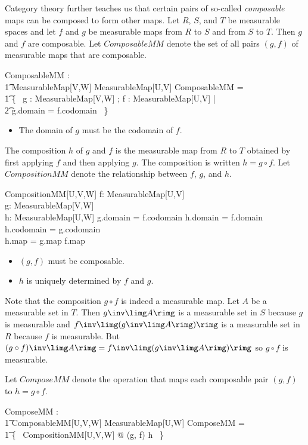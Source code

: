 \documentclass{article}
\begin{document}
Category theory further teaches us that certain pairs of so-called {\it composable} maps can be composed to form other maps.
Let $R$, $S$, and $T$ be measurable spaces and let $f$ and $g$ be measurable maps from $R$ to $S$ and from $S$ to $T$.
Then $g$ and $f$ are composable.
Let $ComposableMM$ denote the set of all pairs $(g,f)$ of measurable maps that are composable.
\begin{gendef}[U,V,W]
	ComposableMM : \\
\t1		MeasurableMap[V,W] \rel MeasurableMap[U,V]
\where
	ComposableMM = \\
\t1		\{~  g : MeasurableMap[V,W] ; f : MeasurableMap[U,V] | \\
\t2			g.domain = f.codomain ~\}
\end{gendef}
\begin{itemize}
\item  The domain of $g$ must be the codomain of $f$.
\end{itemize}

The composition $h$ of $g$ and $f$ is the measurable map from $R$ to $T$ obtained by first applying $f$ and then applying $g$.
The composition is written $h = g \circ f$. 
Let $CompositionMM$ denote the relationship between $f$, $g$, and $h$.
\begin{schema}{CompositionMM}[U,V,W]
	f: MeasurableMap[U,V] \\
	g: MeasurableMap[V,W] \\
	h: MeasurableMap[U,W]
\where
	g.domain = f.codomain
\also
	h.domain = f.domain \\
	h.codomain = g.codomain \\
	h.map = g.map \circ f.map
\end{schema}
\begin{itemize}
\item $(g, f)$ must be composable.
\item $h$ is uniquely determined by $f$ and $g$.
\end{itemize}

Note that the composition $g \circ f$ is indeed a measurable map. 
Let $A$ be a measurable set in $T$.
Then $g\inv\limg A \rimg$ is a measurable set in $S$ because $g$ is measurable
and $f\inv\limg (g\inv\limg A \rimg) \rimg$ is a measurable set in $R$ because $f$ is measurable.
But $(g\circ f)\inv\limg A \rimg = f\inv\limg (g\inv\limg A \rimg) \rimg$ so $g \circ f$ is measurable.

Let $ComposeMM$ denote the operation that maps each composable pair $(g,f)$ to $h = g \circ f$.
\begin{gendef}[U,V,W]
	ComposeMM : \\
\t1		ComposableMM[U,V,W] \fun MeasurableMap[U,W]
\where
	ComposeMM = \\
\t1		\{~  CompositionMM[U,V,W] @ (g, f) \mapsto h ~\}
\end{gendef}
 
\end{document}
